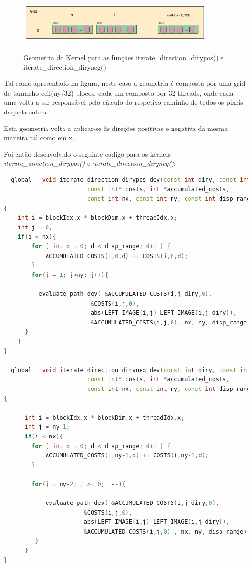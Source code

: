 \documentclass[pdftex,12pt,a4paper]{report}
\begin{document}
\begin{figure}[!htb]
\center
 \includegraphics[width=100mm,scale=1]{IteratePositionDiryposneg_v1_kernel.pdf}
 \caption{\\ Geometria do Kernel para as funções iterate\_direction\_dirypos() e iterate\_direction\_diryneg()}
 \label{fig:IteratePositionDiryposneg_v1_kernel}
\end{figure}

Tal como apresentado na figura, neste caso a geometria é composta por uma grid de tamanho ceil(ny/32) blocos, cada um composto por 32 threads, onde cada uma volta a ser responsável pelo cálculo do respetivo caminho de todos os pixeis daquela coluna. 

Esta geometria volta a aplicar-se às direções positivas e negativa da mesma maneira tal como em x.

Foi então desenvolvido o seguinte código para os kernels \textit{iterate\_direction\_dirypos()} e \textit{iterate\_direction\_diryneg()}:

\begin{lstlisting}[language=c++, basicstyle=\scriptsize]
__global__ void iterate_direction_dirypos_dev(const int diry, const int *left_image,
                        const int* costs, int *accumulated_costs,
                        const int nx, const int ny, const int disp_range )
{
    int i = blockIdx.x * blockDim.x + threadIdx.x;
    int j = 0;
    if(i < nx){
        for ( int d = 0; d < disp_range; d++ ) {
            ACCUMULATED_COSTS(i,0,d) += COSTS(i,0,d);
        }
        for(j = 1; j<ny; j++){

          evaluate_path_dev( &ACCUMULATED_COSTS(i,j-diry,0),
                         &COSTS(i,j,0),
                         abs(LEFT_IMAGE(i,j)-LEFT_IMAGE(i,j-diry)),
                         &ACCUMULATED_COSTS(i,j,0), nx, ny, disp_range );
      }
    }
}

__global__ void iterate_direction_diryneg_dev(const int diry, const int *left_image,
                        const int* costs, int *accumulated_costs,
                        const int nx, const int ny, const int disp_range )
{

      int i = blockIdx.x * blockDim.x + threadIdx.x;
      int j = ny-1;
      if(i < nx){
        for ( int d = 0; d < disp_range; d++ ) {
            ACCUMULATED_COSTS(i,ny-1,d) += COSTS(i,ny-1,d);
        }

        for(j = ny-2; j >= 0; j--){

            evaluate_path_dev( &ACCUMULATED_COSTS(i,j-diry,0),
                       &COSTS(i,j,0),
                       abs(LEFT_IMAGE(i,j)-LEFT_IMAGE(i,j-diry)),
                       &ACCUMULATED_COSTS(i,j,0) , nx, ny, disp_range);
         }
      }
}
\end{lstlisting} 
\end{document}
